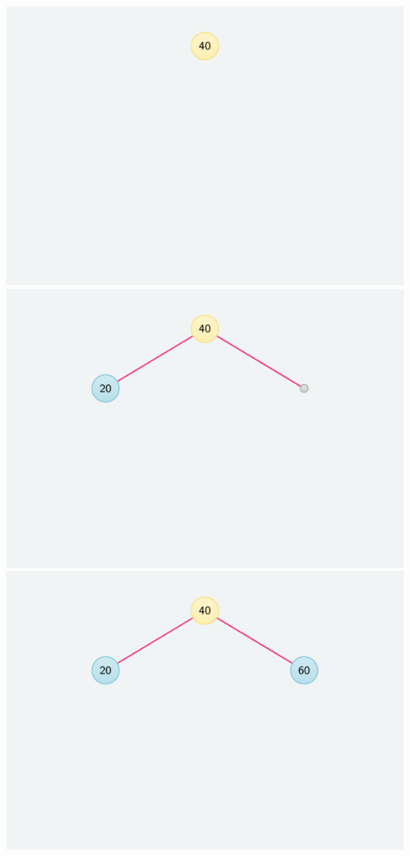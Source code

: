 \documentclass[crop,10pt]{standalone}
\begin{document}
    \includegraphics{frames/tree-00.pdf}
    \includegraphics{frames/tree-01.pdf}
    \includegraphics{frames/tree-02.pdf}
\end{document}
